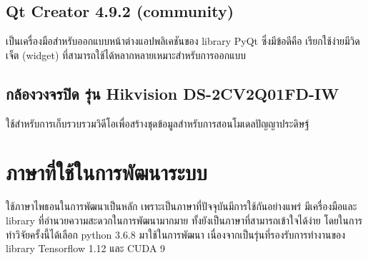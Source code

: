 \subsection*{Qt Creator 4.9.2 (community)}
เป็นเครื่องมือสำหรับออกแบบหน้าต่างแอปพลิเคชันของ library PyQt ซึ่งมีข้อดีคือ เรียกใช้ง่ายมีวิดเจ็ต (widget) ที่สามารถใช้ได้หลากหลายเหมาะสำหรับการออกแบบ

\subsection*{กล้องวงจรปิด รุ่น Hikvision DS-2CV2Q01FD-IW}
ใช้สำหรับการเก็บรวบรวมวิดีโอเพื่อสร้างชุดข้อมูลสำหรับการสอนโมเดลปัญญาประดิษฐ์
\clearpage
\section{ภาษาที่ใช้ในการพัฒนาระบบ} 
	ใช้ภาษาไพธอนในการพัฒนาเป็นหลัก เพราะเป็นภาษาที่ปัจจุบันมีการใช้กันอย่างแพร่ มีเครื่องมือและ library ที่อำนวยความสะดวกในการพัฒนามากมาย 
	ทั้งยังเป็นภาษาที่สามารถเข้าใจได้ง่าย โดยในการทำวิจัยครั้งนี้ได้เลือก python 3.6.8 มาใช้ในการพัฒนา 
	เนื่องจากเป็นรุ่นที่รองรับการทำงานของ library Tensorflow 1.12 และ CUDA 9
\vspace{3mm}
